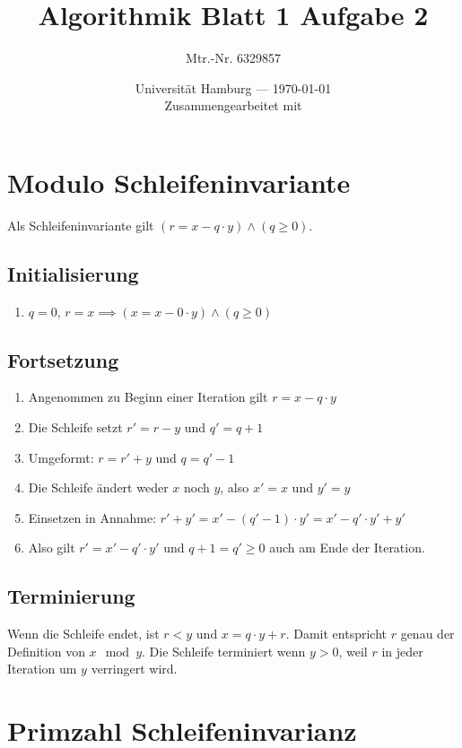 \documentclass[parskip=half,a4paper]{scrartcl}
\title{Algorithmik Blatt 1 Aufgabe 2}
\author{Mtr.-Nr. 6329857}
\date{Universität Hamburg --- \today \\ Zusammengearbeitet mit}
\begin{document}
\maketitle

\section*{Modulo Schleifeninvariante}

Als Schleifeninvariante gilt $(r = x - q \cdot y) \land (q \ge 0)$.

\subsection*{Initialisierung}

\begin{enumerate}
	\item $q = 0$, $r = x \implies (x = x - 0 \cdot y) \land (q \ge 0)$
\end{enumerate}

\subsection*{Fortsetzung}

\begin{enumerate}
	\item Angenommen zu Beginn einer Iteration gilt $r = x - q \cdot y$
	\item Die Schleife setzt $r' = r - y$ und $q' = q + 1$
	\item Umgeformt: $r = r' + y$ und $q = q' - 1$
	\item Die Schleife ändert weder $x$ noch $y$, also $x' = x$ und $y' = y$
	\item Einsetzen in Annahme: $r' + y' = x' - (q' - 1) \cdot y' = x' - q' \cdot y' + y'$
	\item Also gilt $r' = x' - q' \cdot y'$ und $q + 1 = q' \ge 0$ auch am Ende der Iteration.
\end{enumerate}

\subsection*{Terminierung}

Wenn die Schleife endet, ist $r < y$ und $x = q \cdot y + r$. Damit entspricht $r$ genau der Definition von $x \mod y$. Die Schleife terminiert wenn $y > 0$, weil $r$ in jeder Iteration um $y$ verringert wird.

\section*{Primzahl Schleifeninvarianz}
\end{document}
